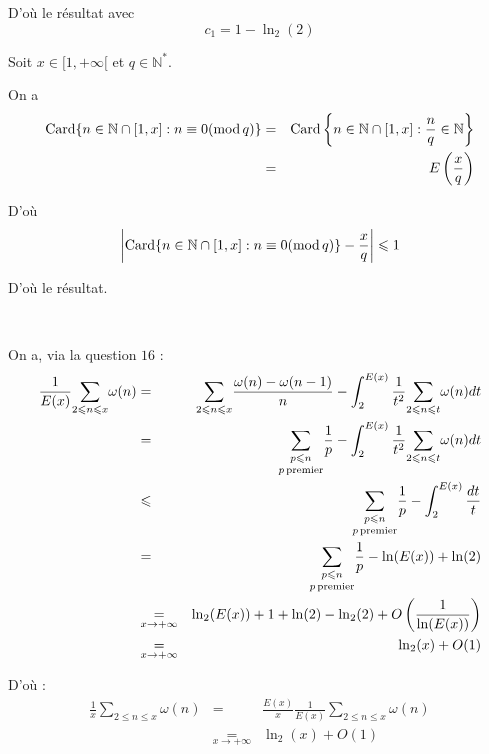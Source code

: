 D'o{\`u} le r{\'e}sultat avec
\[ c_1 = 1 - \ln_2 (2) \]


 Soit $x \in [1, + \infty [$ et $q \in \mathbb{N}^{\ast}$.

On a
\begin{eqnarray*}
  \operatorname{Card} \{ n \in \mathbb{N} \cap [1, x] : n \equiv 0 (\operatorname{mod} q) \} &
  = & \operatorname{Card} \left\{ n \in \mathbb{N} \cap [1, x] : \frac{n}{q} \in
  \mathbb{N} \right\}\\
  & = & E \left( \frac{x}{q} \right)
\end{eqnarray*}


D'o{\`u}
\[ \left| \operatorname{Card} \{ n \in \mathbb{N} \cap [1, x] : n \equiv 0
   (\operatorname{mod} q) \} - \frac{x}{q} \right| \leqslant 1 \]


D'o{\`u} le r{\'e}sultat.

\

 On a, via la question $16$ :
\begin{eqnarray*}
  \frac{1}{E (x)} \underset{2 \leqslant n \leqslant x}{\sum} \omega (n) & = &
  \underset{2 \leqslant n \leqslant x}{\sum} \frac{\omega (n) - \omega (n -
  1)}{n} - \int^{E (x)}_2 \frac{1}{t^2} \underset{2 \leqslant n \leqslant
  t}{\sum} \omega (n) d t\\
  & = & \underset{p \operatorname{premier}}{\underset{p \leqslant n}{\sum}}
  \frac{1}{p} - \int^{E (x)}_2 \frac{1}{t^2} \underset{2 \leqslant n \leqslant
  t}{\sum} \omega (n) d t\\
  & \leqslant & \underset{p \operatorname{premier}}{\underset{p \leqslant n}{\sum}}
  \frac{1}{p} - \int^{E (x)}_2 \frac{d t}{t}\\
  & = & \underset{p \operatorname{premier}}{\underset{p \leqslant n}{\sum}}
  \frac{1}{p} - \ln (E (x)) + \ln (2)\\
  & \underset{x \rightarrow + \infty}{=} & \ln_2 (E (x)) + 1 + \ln (2) -
  \ln_2 (2) + O \left( \frac{1}{\ln (E (x))} \right)\\
  & \underset{x \rightarrow + \infty}{=} & \ln_2 (x) + O (1)
\end{eqnarray*}


D'o{\`u} :
\begin{eqnarray*}
  \frac{1}{x} \underset{2 \leqslant n \leqslant x}{\sum} \omega (n) & = &
  \frac{E (x)}{x} \frac{1}{E (x)} \underset{2 \leqslant n \leqslant x}{\sum}
  \omega (n)\\
  & \underset{x \rightarrow + \infty}{=} & \ln_2 (x) + O (1)
\end{eqnarray*}


